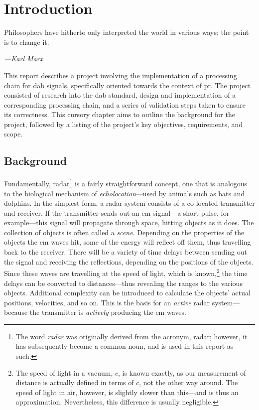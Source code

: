 \documentclass[class=report,11pt,crop=false]{standalone}
\begin{document}
\chapter{Introduction}
\epigraph{Philosophers have hitherto only interpreted the world in various ways; the point is to change it.}%
    {\emph{---Karl Marx}}

This report describes a project involving the implementation of a processing chain for \gls{dab} signals, specifically oriented towards the context of \gls{pr}. The project consisted of research into the \gls{dab} standard, design and implementation of a corresponding processing chain, and a series of validation steps taken to ensure its correctness. This cursory chapter aims to outline the background for the project, followed by a listing of the project's key objectives, requirements, and scope.

\section{Background}
Fundamentally, radar\footnote{The word \emph{radar} was originally derived from the acronym, \acrlong{radar}; however, it has subsequently become a common noun, and is used in this report as such.} is a fairly straightforward concept, one that is analogous to the biological mechanism of \emph{echolocation}---used by animals such as bats and dolphins. In the simplest form, a radar system consists of a co-located transmitter and receiver. If the transmitter sends out an \gls{em} signal---a short pulse, for example---this signal will propagate through space, hitting objects as it does. The collection of objects is often called a \emph{scene}. Depending on the properties of the objects the \gls{em} waves hit, some of the energy will reflect off them, thus travelling back to the receiver. There will be a variety of time delays between sending out the signal and receiving the reflections, depending on the positions of the objects. Since these waves are travelling at the speed of light, which is known,\footnote{The speed of light in a vacuum, \(c\), is known exactly, as our measurement of distance is actually defined in terms of \(c\), not the other way around. The speed of light in air, however, is slightly slower than this---and is thus an approximation. Nevertheless, this difference is usually negligible.} the time delays can be converted to distances---thus revealing the ranges to the various objects. Additional complexity can be introduced to calculate the objects' actual positions, velocities, and so on. This is the basis for an \emph{active} radar system---because the transmitter is \emph{actively} producing the \gls{em} waves.
\end{document}
